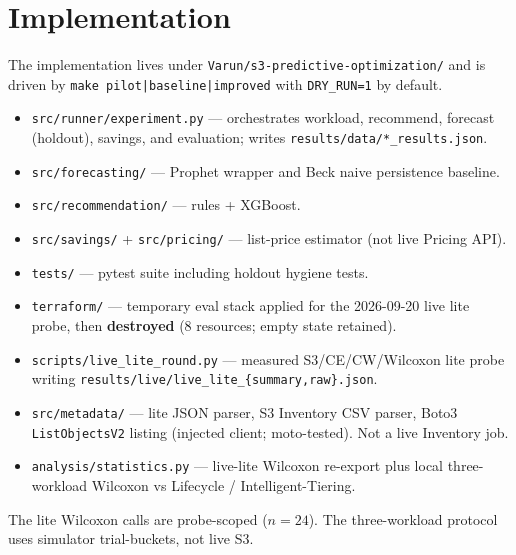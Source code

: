 \chapter{Implementation}

The implementation lives under \texttt{Varun/s3-predictive-optimization/} and is driven by
\texttt{make pilot|baseline|improved} with \texttt{DRY\_RUN=1} by default.

\begin{itemize}
    \item \texttt{src/runner/experiment.py} --- orchestrates workload, recommend, forecast
          (holdout), savings, and evaluation; writes
          \texttt{results/data/*\_results.json}.
    \item \texttt{src/forecasting/} --- Prophet wrapper and Beck naive persistence baseline.
    \item \texttt{src/recommendation/} --- rules + XGBoost.
    \item \texttt{src/savings/} + \texttt{src/pricing/} --- list-price estimator (not live
          Pricing API).
    \item \texttt{tests/} --- pytest suite including holdout hygiene tests.
    \item \texttt{terraform/} --- temporary eval stack applied for the 2026-09-20
          live lite probe, then \textbf{destroyed} (8 resources; empty state retained).
    \item \texttt{scripts/live\_lite\_round.py} --- measured S3/CE/CW/Wilcoxon lite probe
          writing \texttt{results/live/live\_lite\_\{summary,raw\}.json}.
    \item \texttt{src/metadata/} --- lite JSON parser, S3 Inventory CSV parser, Boto3
          \texttt{ListObjectsV2} listing (injected client; moto-tested). Not a live Inventory job.
    \item \texttt{analysis/statistics.py} --- live-lite Wilcoxon re-export plus local
          three-workload Wilcoxon vs Lifecycle / Intelligent-Tiering.
\end{itemize}

The lite Wilcoxon calls are probe-scoped ($n{=}24$). The three-workload protocol uses
simulator trial-buckets, not live S3.
